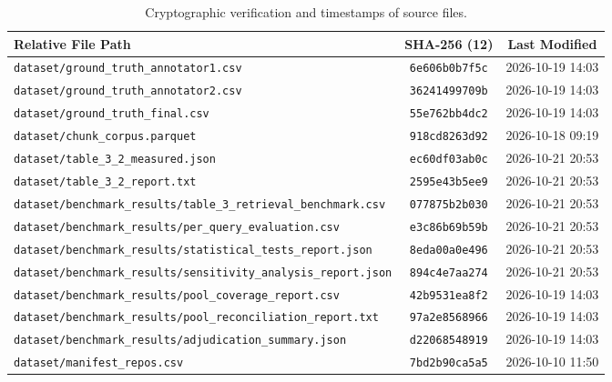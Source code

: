 \begin{table}[htbp]
\caption{Cryptographic verification and timestamps of source files.}
\label{tab:file_provenance}
\centering\scriptsize
\setlength{\tabcolsep}{12pt}
\begin{tabular}{@{}lcc@{}}
\toprule
Relative File Path & SHA-256 (12) & Last Modified \\
\midrule
\texttt{dataset/ground\_truth\_annotator1.csv} & \texttt{6e606b0b7f5c} & 2026-10-19 14:03 \\
\texttt{dataset/ground\_truth\_annotator2.csv} & \texttt{36241499709b} & 2026-10-19 14:03 \\
\texttt{dataset/ground\_truth\_final.csv} & \texttt{55e762bb4dc2} & 2026-10-19 14:03 \\
\texttt{dataset/chunk\_corpus.parquet} & \texttt{918cd8263d92} & 2026-10-18 09:19 \\
\texttt{dataset/table\_3\_2\_measured.json} & \texttt{ec60df03ab0c} & 2026-10-21 20:53 \\
\texttt{dataset/table\_3\_2\_report.txt} & \texttt{2595e43b5ee9} & 2026-10-21 20:53 \\
\texttt{dataset/benchmark\_results/table\_3\_retrieval\_benchmark.csv} & \texttt{077875b2b030} & 2026-10-21 20:53 \\
\texttt{dataset/benchmark\_results/per\_query\_evaluation.csv} & \texttt{e3c86b69b59b} & 2026-10-21 20:53 \\
\texttt{dataset/benchmark\_results/statistical\_tests\_report.json} & \texttt{8eda00a0e496} & 2026-10-21 20:53 \\
\texttt{dataset/benchmark\_results/sensitivity\_analysis\_report.json} & \texttt{894c4e7aa274} & 2026-10-21 20:53 \\
\texttt{dataset/benchmark\_results/pool\_coverage\_report.csv} & \texttt{42b9531ea8f2} & 2026-10-19 14:03 \\
\texttt{dataset/benchmark\_results/pool\_reconciliation\_report.txt} & \texttt{97a2e8568966} & 2026-10-19 14:03 \\
\texttt{dataset/benchmark\_results/adjudication\_summary.json} & \texttt{d22068548919} & 2026-10-19 14:03 \\
\texttt{dataset/manifest\_repos.csv} & \texttt{7bd2b90ca5a5} & 2026-10-10 11:50 \\
\bottomrule
\end{tabular}
\end{table}